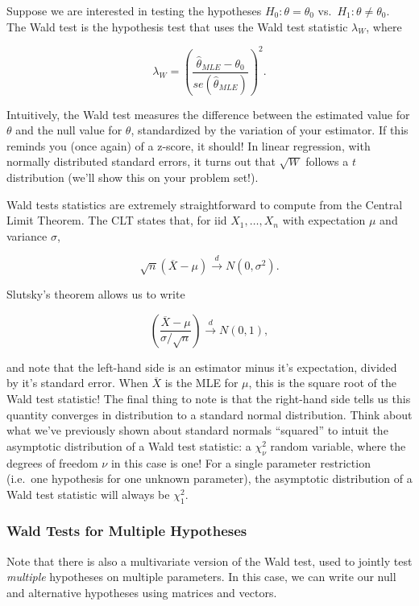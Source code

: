 \documentclass[
  letterpaper,
  DIV=11,
  numbers=noendperiod]{scrreprt}
\begin{document}
Suppose we are interested in testing the hypotheses
\(H_0: \theta = \theta_0\) vs.~\(H_1: \theta \neq \theta_0\). The Wald
test is the hypothesis test that uses the Wald test statistic
\(\lambda_{W}\), where

\[
\lambda_W = \left( \frac{\hat{\theta}_{MLE} - \theta_0}{se(\hat{\theta}_{MLE})}\right)^2.
\]

Intuitively, the Wald test measures the difference between the estimated
value for \(\theta\) and the null value for \(\theta\), standardized by
the variation of your estimator. If this reminds you (once again) of a
z-score, it should! In linear regression, with normally distributed
standard errors, it turns out that \(\sqrt{W}\) follows a \(t\)
distribution (we'll show this on your problem set!).

Wald tests statistics are extremely straightforward to compute from the
Central Limit Theorem. The CLT states that, for iid \(X_1, \dots, X_n\)
with expectation \(\mu\) and variance \(\sigma\),

\[
\sqrt{n} (\overline{X} - \mu) \overset{d}{\to} N(0, \sigma^2).
\]

Slutsky's theorem allows us to write

\[
\left( \frac{\overline{X} - \mu}{\sigma / \sqrt{n}}\right) \overset{d}{\to} N(0,1),
\]

and note that the left-hand side is an estimator minus it's expectation,
divided by it's standard error. When \(\overline{X}\) is the MLE for
\(\mu\), this is the square root of the Wald test statistic! The final
thing to note is that the right-hand side tells us this quantity
converges in distribution to a standard normal distribution. Think about
what we've previously shown about standard normals ``squared'' to intuit
the asymptotic distribution of a Wald test statistic: a \(\chi^2_\nu\)
random variable, where the degrees of freedom \(\nu\) in this case is
one! For a single parameter restriction (i.e.~one hypothesis for one
unknown parameter), the asymptotic distribution of a Wald test statistic
will always be \(\chi^2_1\).

\subsubsection*{Wald Tests for Multiple
Hypotheses}\label{wald-tests-for-multiple-hypotheses}

Note that there is also a multivariate version of the Wald test, used to
jointly test \emph{multiple} hypotheses on multiple parameters. In this
case, we can write our null and alternative hypotheses using matrices
and vectors.
\end{document}

